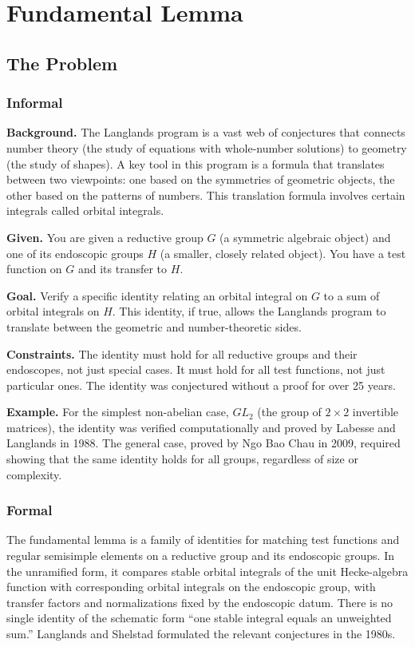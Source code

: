 \let\LocalMacro\relax

\chapter{Fundamental Lemma}

\section{The Problem}

\subsection{Informal}

\textbf{Background.} The Langlands program is a vast web of conjectures that connects number theory (the study of equations with whole-number solutions) to geometry (the study of shapes). A key tool in this program is a formula that translates between two viewpoints: one based on the symmetries of geometric objects, the other based on the patterns of numbers. This translation formula involves certain integrals called orbital integrals.

\textbf{Given.} You are given a reductive group $G$ (a symmetric algebraic object) and one of its endoscopic groups $H$ (a smaller, closely related object). You have a test function on $G$ and its transfer to $H$.

\textbf{Goal.} Verify a specific identity relating an orbital integral on $G$ to a sum of orbital integrals on $H$. This identity, if true, allows the Langlands program to translate between the geometric and number-theoretic sides.

\textbf{Constraints.} The identity must hold for all reductive groups and their endoscopes, not just special cases. It must hold for all test functions, not just particular ones. The identity was conjectured without a proof for over 25 years.

\textbf{Example.} For the simplest non-abelian case, $GL_2$ (the group of $2 \times 2$ invertible matrices), the identity was verified computationally and proved by Labesse and Langlands in 1988. The general case, proved by Ngo Bao Chau in 2009, required showing that the same identity holds for all groups, regardless of size or complexity.

\subsection{Formal}
The fundamental lemma is a family of identities for matching test functions and regular semisimple elements on a reductive group and its endoscopic groups. In the unramified form, it compares stable orbital integrals of the unit Hecke-algebra function with corresponding orbital integrals on the endoscopic group, with transfer factors and normalizations fixed by the endoscopic datum. There is no single identity of the schematic form “one stable integral equals an unweighted sum.” Langlands and Shelstad formulated the relevant conjectures in the 1980s.

